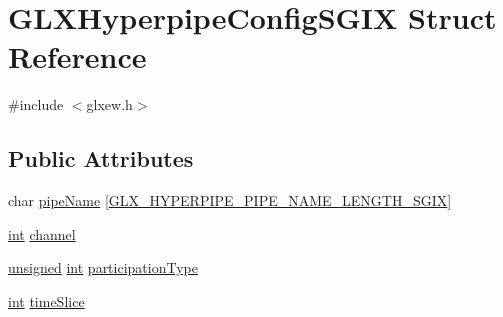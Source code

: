 \hypertarget{struct_g_l_x_hyperpipe_config_s_g_i_x}{\section{G\-L\-X\-Hyperpipe\-Config\-S\-G\-I\-X Struct Reference}
\label{struct_g_l_x_hyperpipe_config_s_g_i_x}
}


{\ttfamily \#include $<$glxew.\-h$>$}

\subsection*{Public Attributes}
\begin{DoxyCompactItemize}
\item 
char \hyperlink{struct_g_l_x_hyperpipe_config_s_g_i_x_a9e3748f92005cac81cb44d4c67acccb8}{pipe\-Name} \mbox{[}\hyperlink{glxew_8h_ae1c8261c0861010d8003a31d07e26005}{G\-L\-X\-\_\-\-H\-Y\-P\-E\-R\-P\-I\-P\-E\-\_\-\-P\-I\-P\-E\-\_\-\-N\-A\-M\-E\-\_\-\-L\-E\-N\-G\-T\-H\-\_\-\-S\-G\-I\-X}\mbox{]}
\item 
\hyperlink{wglew_8h_a500a82aecba06f4550f6849b8099ca21}{int} \hyperlink{struct_g_l_x_hyperpipe_config_s_g_i_x_abc812d8796ba89d5de4e33b3532d8335}{channel}
\item 
\hyperlink{_free_image_8h_a425076c7067a1b5166e2cc530e914814}{unsigned} \hyperlink{wglew_8h_a500a82aecba06f4550f6849b8099ca21}{int} \hyperlink{struct_g_l_x_hyperpipe_config_s_g_i_x_a093cfaaec305531f66e1120929b5b01b}{participation\-Type}
\item 
\hyperlink{wglew_8h_a500a82aecba06f4550f6849b8099ca21}{int} \hyperlink{struct_g_l_x_hyperpipe_config_s_g_i_x_afe9288e75dc1ae5e0f33eff978d7024d}{time\-Slice}
\end{DoxyCompactItemize}


